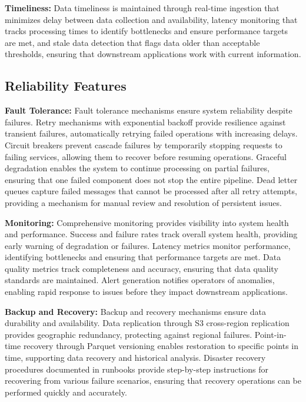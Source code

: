 \documentclass[12pt,a4paper]{article}
\begin{document}
\textbf{Timeliness:} Data timeliness is maintained through real-time ingestion that minimizes delay between data collection and availability, latency monitoring that tracks processing times to identify bottlenecks and ensure performance targets are met, and stale data detection that flags data older than acceptable thresholds, ensuring that downstream applications work with current information.

\subsection{Reliability Features}

\textbf{Fault Tolerance:} Fault tolerance mechanisms ensure system reliability despite failures. Retry mechanisms with exponential backoff provide resilience against transient failures, automatically retrying failed operations with increasing delays. Circuit breakers prevent cascade failures by temporarily stopping requests to failing services, allowing them to recover before resuming operations. Graceful degradation enables the system to continue processing on partial failures, ensuring that one failed component does not stop the entire pipeline. Dead letter queues capture failed messages that cannot be processed after all retry attempts, providing a mechanism for manual review and resolution of persistent issues.

\textbf{Monitoring:} Comprehensive monitoring provides visibility into system health and performance. Success and failure rates track overall system health, providing early warning of degradation or failures. Latency metrics monitor performance, identifying bottlenecks and ensuring that performance targets are met. Data quality metrics track completeness and accuracy, ensuring that data quality standards are maintained. Alert generation notifies operators of anomalies, enabling rapid response to issues before they impact downstream applications.

\textbf{Backup and Recovery:} Backup and recovery mechanisms ensure data durability and availability. Data replication through S3 cross-region replication provides geographic redundancy, protecting against regional failures. Point-in-time recovery through Parquet versioning enables restoration to specific points in time, supporting data recovery and historical analysis. Disaster recovery procedures documented in runbooks provide step-by-step instructions for recovering from various failure scenarios, ensuring that recovery operations can be performed quickly and accurately.
\end{document}

